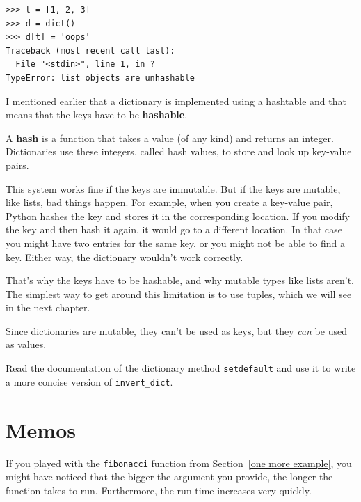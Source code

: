\documentclass[10pt]{book}
\begin{document}


\beforeverb
\begin{verbatim}
>>> t = [1, 2, 3]
>>> d = dict()
>>> d[t] = 'oops'
Traceback (most recent call last):
  File "<stdin>", line 1, in ?
TypeError: list objects are unhashable
\end{verbatim}
\afterverb
%
I mentioned earlier that a dictionary is implemented using
a hashtable and that means that the keys have to be {\bf hashable}.


A {\bf hash} is a function that takes a value (of any kind)
and returns an integer.  Dictionaries use these integers,
called hash values, to store and look up key-value pairs.


This system works fine if the keys are immutable.  But if the
keys are mutable, like lists, bad things happen.  For example,
when you create a key-value pair, Python hashes the key and 
stores it in the corresponding location.  If you modify the
key and then hash it again, it would go to a different location.
In that case you might have two entries for the same key,
or you might not be able to find a key.  Either way, the
dictionary wouldn't work correctly.

That's why the keys have to be hashable, and why mutable types like
lists aren't.  The simplest way to get around this limitation is to
use tuples, which we will see in the next chapter.

Since dictionaries are mutable, they can't be used as keys,
but they {\em can} be used as values.

\begin{ex}
Read the documentation of the dictionary method {\tt setdefault}
and use it to write a more concise version of \verb"invert_dict".


\end{ex}


\section{Memos}

If you played with the {\tt fibonacci} function from
Section~\ref{one more example}, you might have noticed that the bigger
the argument you provide, the longer the function takes to run.
Furthermore, the run time increases very quickly.
\end{document}
